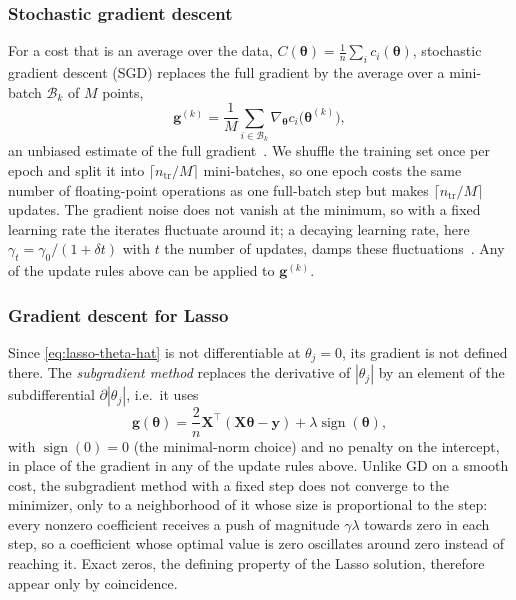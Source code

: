 \subsubsection{Stochastic gradient descent}
For a cost that is an average over the data, $C(\bm{\theta}) = \frac{1}{n}
\sum_i c_i(\bm{\theta})$, stochastic gradient descent (SGD) replaces the full
gradient by the average over a mini-batch $\mathcal{B}_k$ of $M$ points,
\begin{equation}
    \bm{g}^{(k)} = \frac{1}{M}\sum_{i\in\mathcal{B}_k}\nabla_{\bm{\theta}}
    c_i\big(\bm{\theta}^{(k)}\big),
\end{equation}
an unbiased estimate of the full gradient~\cite{goodfellow_2016}. We
shuffle the training set once per epoch and split it into $\lceil n_\text{tr}/M
\rceil$ mini-batches, so one epoch costs the same number of floating-point
operations as one full-batch step but makes $\lceil n_\text{tr}/M\rceil$
updates. The gradient noise does not vanish at the minimum, so with a fixed
learning rate the iterates fluctuate around it; a decaying learning rate,
here $\gamma_t = \gamma_0/(1+ \delta t)$ with $t$ the number of updates, damps
these fluctuations~\cite{hjorth-jensen_2026}. Any of the
update rules above can be applied to $\bm{g}^{(k)}$.

\subsubsection{Gradient descent for Lasso}
Since \cref{eq:lasso-theta-hat} is not differentiable at $\theta_j = 0$, its
gradient is not defined there. The \emph{subgradient method} replaces the
derivative of $|\theta_j|$ by an element of the subdifferential
$\partial|\theta_j|$, i.e.\ it uses
\begin{equation}\label{eq:lasso_subgradient}
    \bm{g}(\bm{\theta}) = \frac{2}{n}\bm{X}^\top(\bm{X}\bm{\theta}-\bm{y})
    + \lambda\operatorname{sign}(\bm{\theta}),
\end{equation}
with $\operatorname{sign}(0) = 0$ (the minimal-norm choice) and no penalty on the
intercept, in place of the gradient in any of the update rules above. Unlike GD
on a smooth cost, the subgradient method with a fixed step does not converge to
the minimizer, only to a neighborhood of it whose size is proportional to the
step: every nonzero coefficient receives a push of magnitude $\gamma\lambda$
towards zero in each step, so a coefficient whose optimal value is zero
oscillates around zero instead of reaching it. Exact zeros, the defining
property of the Lasso solution, therefore appear only by coincidence.

